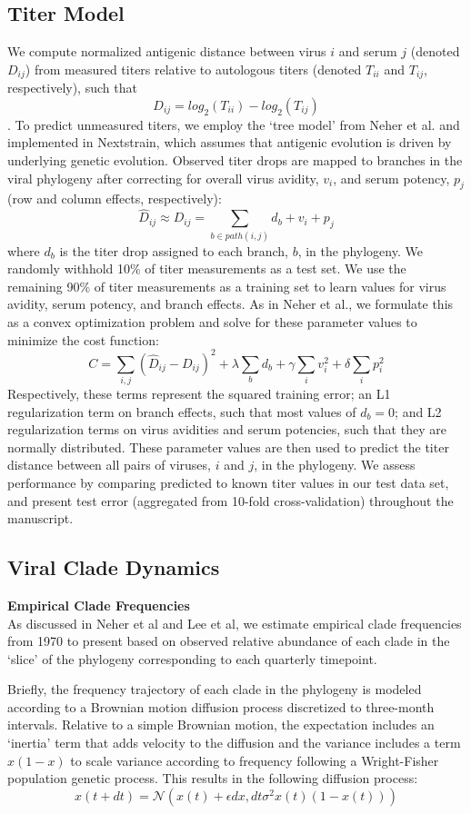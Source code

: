 \documentclass[11pt,oneside,letterpaper]{article}
\begin{document}
\subsection*{Titer Model}
We compute normalized antigenic distance between virus $i$ and serum $j$ (denoted $D_{ij}$) from measured titers relative to autologous titers (denoted $T_{ii}$ and $T_{ij}$, respectively), such that $$D_{ij} = log_2(T_{ii}) - log_2(T_{ij})$$.
To predict unmeasured titers, we employ the `tree model' from Neher et al. and implemented in Nextstrain, which assumes that antigenic evolution is driven by underlying genetic evolution.
Observed titer drops are mapped to branches in the viral phylogeny after correcting for overall virus avidity, $v_i$, and serum potency, $p_j$ (row and column effects, respectively):
$$\hat{D}_{ij} \approx D_{ij} = \sum_{b \in path(i,j)} d_b + v_i + p_j$$
where $d_b$ is the titer drop assigned to each branch, $b$, in the phylogeny.
We randomly withhold 10\% of titer measurements as a test set.
We use the remaining 90\% of titer measurements as a training set to learn values for virus avidity, serum potency, and branch effects.
As in Neher et al., we formulate this as a convex optimization problem and solve for these parameter values to minimize the cost function:
$$C = \sum_{i,j} (\hat{D}_{ij} - D_{ij})^2 + \lambda \sum_{b} d_b + \gamma \sum_{i} v_i^2 + \delta \sum_{i} p_i^2$$
Respectively, these terms represent the squared training error; an L1 regularization term on branch effects, such that most values of $d_b = 0$; and L2 regularization terms on virus avidities and serum potencies, such that they are normally distributed.
These parameter values are then used to predict the titer distance between all pairs of viruses, $i$ and $j$, in the phylogeny.
We assess performance by comparing predicted to known titer values in our test data set, and present test error (aggregated from 10-fold cross-validation) throughout the manuscript.

\subsection*{Viral Clade Dynamics}

\textbf{Empirical Clade Frequencies}\\
As discussed in Neher et al and Lee et al, we estimate empirical clade frequencies from 1970 to present based on observed relative abundance of each clade in the `slice' of the phylogeny corresponding to each quarterly timepoint.

Briefly, the frequency trajectory of each clade in the phylogeny is modeled according to a Brownian motion diffusion process discretized to three-month intervals.
Relative to a simple Brownian motion, the expectation includes an `inertia' term that adds velocity to the diffusion and the variance includes a term $x(1-x)$ to scale variance according to frequency following a Wright-Fisher population genetic process.
This results in the following diffusion process:
$$x(t+dt) = \mathcal{N}(x(t) + \epsilon dx, dt \sigma^2 x(t) (1-x(t)))$$
\end{document}
